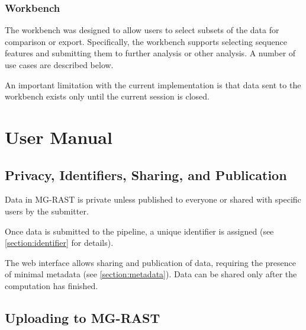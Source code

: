 \documentclass[12pt,fullpage]{report}
\begin{document}
\subsection{Workbench}
The workbench was designed to allow users to select subsets of the data for comparison or export.
Specifically, the workbench supports selecting sequence features and submitting them to further analysis or other analysis. A number of use cases are described below.

An important limitation with the current implementation is that data sent to the workbench exists only until the current session is closed.



\chapter{User Manual}



\section{Privacy, Identifiers, Sharing, and Publication}

Data in MG-RAST is private unless published to everyone or shared with specific users by the submitter.

Once data is submitted to the pipeline, a unique identifier is assigned (see \ref{section:identifier} for details).

The web interface allows sharing and publication of data, requiring the presence of minimal metadata
(see \ref{section:metadata}). Data can be shared only after the computation has finished.



\section{Uploading to MG-RAST}
\end{document}
